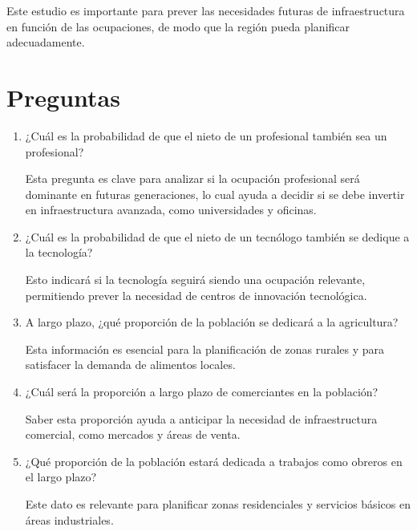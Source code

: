 \documentclass{article}  %
\begin{document}
Este estudio es importante para prever las necesidades futuras de infraestructura en función de las ocupaciones, de modo que la región pueda planificar adecuadamente.

\section*{Preguntas}

\begin{enumerate}
    \item ¿Cuál es la probabilidad de que el nieto de un profesional también sea un profesional?

    Esta pregunta es clave para analizar si la ocupación profesional será dominante en futuras generaciones, lo cual ayuda a decidir si se debe invertir en infraestructura avanzada, como universidades y oficinas.

    \item ¿Cuál es la probabilidad de que el nieto de un tecnólogo también se dedique a la tecnología?

    Esto indicará si la tecnología seguirá siendo una ocupación relevante, permitiendo prever la necesidad de centros de innovación tecnológica.

    \item A largo plazo, ¿qué proporción de la población se dedicará a la agricultura?

    Esta información es esencial para la planificación de zonas rurales y para satisfacer la demanda de alimentos locales.

    \item ¿Cuál será la proporción a largo plazo de comerciantes en la población?

    Saber esta proporción ayuda a anticipar la necesidad de infraestructura comercial, como mercados y áreas de venta.

    \item ¿Qué proporción de la población estará dedicada a trabajos como obreros en el largo plazo?

    Este dato es relevante para planificar zonas residenciales y servicios básicos en áreas industriales.
\end{enumerate}

\newpage
\end{document}

